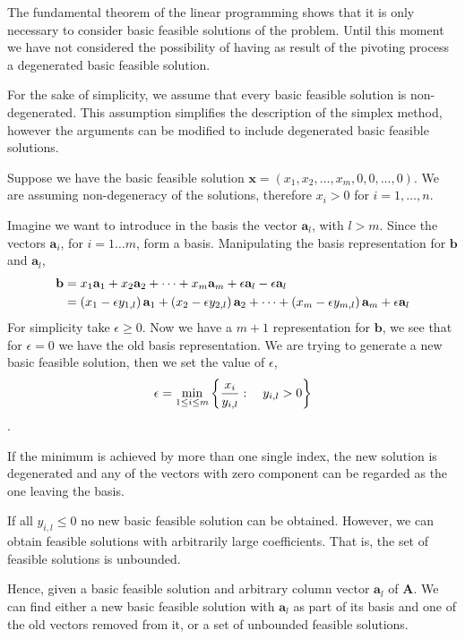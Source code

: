 The fundamental theorem of the linear programming shows that it is only necessary to consider basic feasible solutions of the problem. Until this moment we have not considered the possibility of having as result of the pivoting process a degenerated basic feasible solution. 

For the sake of simplicity, we assume that every basic feasible solution is non-degenerated. This assumption simplifies the description of the simplex method, however the arguments can be modified to include degenerated basic feasible solutions.

Suppose we have the basic feasible solution $\mathbf{x}=\left(x_1, x_2, \dots, x_m, 0,0, \dots, 0\right)$. We are assuming non-degeneracy of the solutions, therefore $x_i>0$ for $i=1,\dots, n$. 

Imagine we want to introduce in the basis the vector $\mathbf{a}_l$, with $l>m$. Since the vectors $\mathbf{a}_i$, for $i=1\dots m$, form a basis. Manipulating the basis representation for $\mathbf{b}$ and $\mathbf{a}_l$, 
\begin{align*}
	\mathbf{b}&=x_1\mathbf{a}_1+x_2\mathbf{a}_2+\dots+x_m\mathbf{a}_m + \epsilon \mathbf{a}_l - \epsilon\mathbf{a}_l\\
	&=\left( x_1-\epsilon y_{1,l} \right)\mathbf{a}_1+\left( x_2-\epsilon y_{2, l} \right)\mathbf{a}_2+\dots+\left( x_m-\epsilon y_{m, l} \right)\mathbf{a}_m +\epsilon \mathbf{a}_l
\end{align*} 
For simplicity take $\epsilon \geq 0$. Now we have a $m+1$ representation for $\mathbf{b}$, we see that for $\epsilon=0$ we have the old basis representation. We are trying to generate a new basic feasible solution, then we set the value of $\epsilon$, \begin{equation*}
	\epsilon=\min_{1\leq i\leq m}\left\lbrace \frac{x_i}{y_{i,l}}: \quad y_{i,l}>0 \right\rbrace
\end{equation*}.

If the minimum is achieved by more than one single index, the new solution is degenerated and any of the vectors with zero component can be regarded as the one leaving the basis.

If all $y_{i,l}\leq 0$ no new basic feasible solution can be obtained. However, we can obtain feasible solutions with arbitrarily large coefficients. That is, the set of feasible solutions is unbounded.  

Hence, given a basic feasible solution and arbitrary column vector $\mathbf{a}_l$ of $\mathbf{A}$. We can find either a new basic feasible solution with $\mathbf{a}_l$ as part of its basis and one of the old vectors removed from it, or a set of unbounded feasible solutions. 

